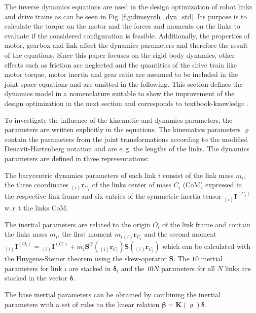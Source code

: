 \documentclass{svproc}
\newcommand{\bm}[1]{\boldsymbol{#1}}
\newcommand{\ortvek}[4]{{ }_{(#1)}{\boldsymbol{#2}}^{#3}_{#4} }
\newcommand{\transp}[0]{{\mathrm{T}}}
\begin{document}
The inverse dynamics equations are used in the design optimization of robot links and drive trains as can be seen in Fig.\,\ref{fig:dimsynth_dyn_std}.
Its purpose is to calculate the torque on the motor and the forces and moments on the links to evaluate if the considered configuration is feasible.
Additionally, the properties of motor, gearbox and link affect the dynamics parameters and therefore the result of the equations.
Since this paper focuses on the rigid body dynamics, other effects such as friction are neglected and the quantities of the drive train like motor torque, motor inertia and gear ratio are assumed to be included in the joint space equations and are omitted in the following.
This section defines the dynamics model in a nomenclature suitable to show the improvement of the design optimization in the next section and corresponds to textbook-knowledge \cite{KhalilDom2002}.

To investigate the influence of the kinematic and dynamics parameters, the parameters are written explicitly in the equations.
The kinematics parameters $\bm{\varrho}$ contain the parameters from the joint transformations according to the modified Denavit-Hartenberg notation and are e.\,g. the lengths of the links.
%
The dynamics parameters are defined in three representations:
\begin{compactitem}
\item The barycentric dynamics parameters of each link $i$ consist of the link mass $m_i$, the three coordinates $\ortvek{i}{r}{}{C_i}$ of the links center of mass $C_i$ (CoM)  expressed in the respective link frame and six entries of the symmetric inertia tensor $\ortvek{i}{I}{(C_i)}{}$ w.\,r.\,t the links CoM. 
\item The inertial parameters are related to the origin $O_i$ of the link frame and contain the links mass $m_i$, the first moment $m_i \ortvek{i}{r}{}{C_i}$ and the second moment $\ortvek{i}{I}{(O_i)}{}=\ortvek{i}{I}{(C_i)}{}+m_i\bm{S}^\transp(\ortvek{i}{r}{}{C_i})\bm{S}(\ortvek{i}{r}{}{C_i})$ which can be calculated with the Huygens-Steiner theorem using the skew-operator $\bm{S}$.
The $10$ inertial parameters for link $i$ are stacked in $\bm{\delta}_i$ and the $10N$ parameters for all $N$ links are stacked in the vector $\bm{\delta}$.
\item The base inertial parameters can be obtained by combining the inertial parameters with a set of rules to the linear relation $\bm{\beta}=\bm{K}(\bm{\varrho})\bm{\delta}$.
\end{compactitem}
%
\end{document}
